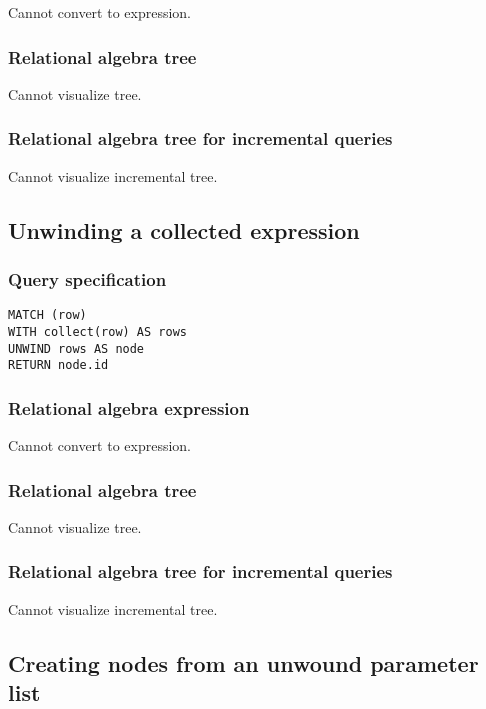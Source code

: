 Cannot convert to expression.

\subsubsection*{Relational algebra tree}

Cannot visualize tree.

\subsubsection*{Relational algebra tree for incremental queries}

Cannot visualize incremental tree.

\subsection{Unwinding a collected expression}

\subsubsection*{Query specification}

\begin{lstlisting}
MATCH (row)
WITH collect(row) AS rows
UNWIND rows AS node
RETURN node.id
\end{lstlisting}

\subsubsection*{Relational algebra expression}

Cannot convert to expression.

\subsubsection*{Relational algebra tree}

Cannot visualize tree.

\subsubsection*{Relational algebra tree for incremental queries}

Cannot visualize incremental tree.

\subsection{Creating nodes from an unwound parameter list}


